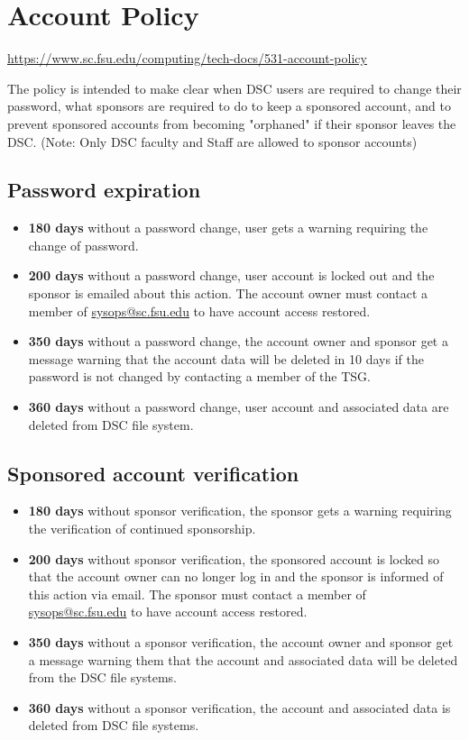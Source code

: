 \documentclass[12pt,a4paper]{article}
\begin{document}
\section{Account Policy}
\url{https://www.sc.fsu.edu/computing/tech-docs/531-account-policy}

The policy is intended to make clear when DSC users are required to change their password, what sponsors are required to do to keep a sponsored account, and to prevent sponsored accounts from becoming "orphaned" if their sponsor leaves the DSC.
(Note: Only DSC faculty and Staff are allowed to sponsor accounts)

\subsection*{Password expiration}
\begin{itemize}
    \item \textbf{180 days} without a password change, user gets a warning requiring the change of password.
    \item \textbf{200 days} without a password change, user account is locked out and the sponsor is emailed about this action. The account owner must contact a member of \href{mailto:sysops@sc.fsu.edu}{sysops@sc.fsu.edu} to have account access restored.
    \item \textbf{350 days} without a password change, the account owner and sponsor get a message warning that the account data will be deleted in 10 days if the password is not changed by contacting a member of the TSG.
    \item \textbf{360 days} without a password change, user account and associated data are deleted from DSC file system.
\end{itemize}

\subsection*{Sponsored account verification}
\begin{itemize}
    \item \textbf{180 days} without sponsor verification, the sponsor gets a warning requiring the verification of continued sponsorship.
    \item \textbf{200 days} without sponsor verification, the sponsored account is locked so that the account owner can no longer log in and the sponsor is informed of this action via email. The sponsor must contact a member of \href{mailto:sysops@sc.fsu.edu}{sysops@sc.fsu.edu} to have account access restored.
    \item \textbf{350 days} without a sponsor verification, the account owner and sponsor get a message warning them that the account and associated data will be deleted from the DSC file systems.
    \item \textbf{360 days} without a sponsor verification, the account and associated data is deleted from DSC file systems.
\end{itemize}
\end{document}
